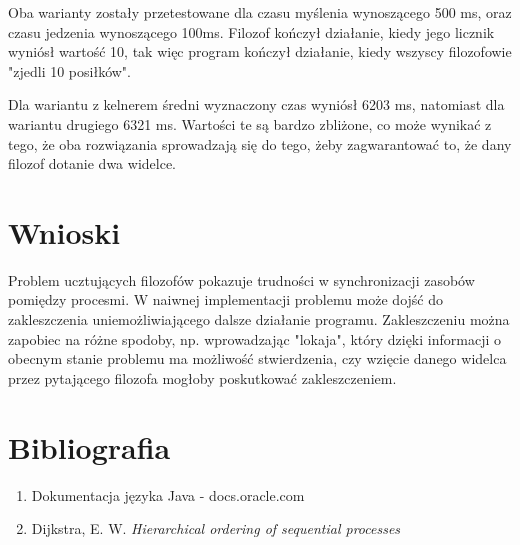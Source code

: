 \documentclass{article}
\begin{document}
Oba warianty zostały przetestowane dla czasu myślenia wynoszącego 500 ms, oraz czasu jedzenia wynoszącego
100ms. Filozof kończył działanie, kiedy jego licznik wyniósł wartość 10, tak więc program kończył działanie,
kiedy wszyscy filozofowie "zjedli 10 posiłków".

Dla wariantu z kelnerem średni wyznaczony czas wyniósł 6203 ms, natomiast dla wariantu drugiego 6321 ms.
Wartości te są bardzo zbliżone, co może wynikać z tego, że oba rozwiązania sprowadzają się do tego, 
żeby zagwarantować to, że dany filozof dotanie dwa widelce.


\section{Wnioski}

Problem ucztujących filozofów pokazuje trudności w synchronizacji zasobów pomiędzy procesmi. W naiwnej
implementacji problemu może dojść do zakleszczenia uniemożliwiającego dalsze działanie programu.
Zakleszczeniu można zapobiec na różne spodoby, np. wprowadzając "lokaja", który dzięki informacji o obecnym
stanie problemu ma możliwość stwierdzenia, czy wzięcie danego widelca przez pytającego filozofa mogłoby
poskutkować zakleszczeniem.

\section{Bibliografia}

\begin{enumerate}
    \item 
    Dokumentacja języka Java - docs.oracle.com
    \item
    Dijkstra, E. W. \textit{Hierarchical ordering of sequential processes}
\end{enumerate}
\end{document}
